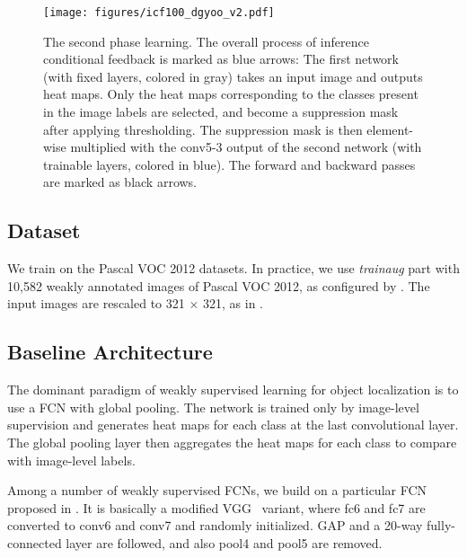 \documentclass[10pt,twocolumn,letterpaper]{article}
\begin{document}
\begin{figure*}[t]
\centering
\texttt{[image: figures/icf100\_dgyoo\_v2.pdf]}
\caption{The second phase learning. The overall process of inference conditional feedback is marked as blue arrows: The first network (with fixed layers, colored in gray) takes an input image and outputs heat maps. Only the heat maps corresponding to the classes present in the image labels are selected, and become a suppression mask after applying thresholding. The suppression mask is then element-wise multiplied with the conv5-3 output of the second network (with trainable layers, colored in blue). The forward and backward passes are marked as black arrows.}
\label{fig:feedback}
\end{figure*}
\vspace{-0.1in}


\subsection{Dataset}
We train on the Pascal VOC 2012 datasets. In practice, we use \textit{trainaug} part with 10,582 weakly annotated images of Pascal VOC 2012, as configured by \cite{HariharanABMM11}. The input images are rescaled to 321 $\times$ 321, as in \cite{kolesnikov2016seed}.

\subsection{Baseline Architecture}
\label{sec:Architecture}
The dominant paradigm of weakly supervised learning for object localization is to use a FCN with global pooling. The network is trained only by image-level supervision and generates heat maps for each class at the last convolutional layer. The global pooling layer then aggregates the heat maps for each class to compare with image-level labels. %


Among a number of weakly supervised FCNs, we build on a particular FCN proposed in \cite{zhou2016cvpr}. It is basically a modified VGG~\cite{Simonyan14c} variant, where fc6 and fc7 are converted to conv6 and conv7 and randomly initialized. GAP and a 20-way fully-connected layer are followed, and also pool4 and pool5 are removed.%
\end{document}
